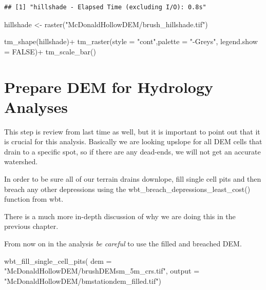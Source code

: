 \documentclass[
]{book}
\newenvironment{Shaded}{\begin{snugshade}}{\end{snugshade}}
\newcommand{\AttributeTok}[1]{\textcolor[rgb]{0.77,0.63,0.00}{#1}}
\newcommand{\ConstantTok}[1]{\textcolor[rgb]{0.00,0.00,0.00}{#1}}
\newcommand{\FunctionTok}[1]{\textcolor[rgb]{0.00,0.00,0.00}{#1}}
\newcommand{\NormalTok}[1]{#1}
\newcommand{\OtherTok}[1]{\textcolor[rgb]{0.56,0.35,0.01}{#1}}
\newcommand{\SpecialCharTok}[1]{\textcolor[rgb]{0.00,0.00,0.00}{#1}}
\newcommand{\StringTok}[1]{\textcolor[rgb]{0.31,0.60,0.02}{#1}}
\begin{document}
\begin{verbatim}
## [1] "hillshade - Elapsed Time (excluding I/O): 0.8s"
\end{verbatim}

\begin{Shaded}
\begin{Highlighting}[]
\NormalTok{hillshade }\OtherTok{\textless{}{-}} \FunctionTok{raster}\NormalTok{(}\StringTok{"McDonaldHollowDEM/brush\_hillshade.tif"}\NormalTok{)}

\FunctionTok{tm\_shape}\NormalTok{(hillshade)}\SpecialCharTok{+}
  \FunctionTok{tm\_raster}\NormalTok{(}\AttributeTok{style =} \StringTok{"cont"}\NormalTok{,}\AttributeTok{palette =} \StringTok{"{-}Greys"}\NormalTok{, }\AttributeTok{legend.show =} \ConstantTok{FALSE}\NormalTok{)}\SpecialCharTok{+}
  \FunctionTok{tm\_scale\_bar}\NormalTok{()}
\end{Highlighting}
\end{Shaded}

\hypertarget{prepare-dem-for-hydrology-analyses-1}{%
\section{Prepare DEM for Hydrology Analyses}\label{prepare-dem-for-hydrology-analyses-1}}

This step is review from last time as well, but it is important to point out that it is crucial for this analysis. Basically we are looking upslope for all DEM cells that drain to a specific spot, so if there are any dead-ends, we will not get an accurate watershed.

In order to be sure all of our terrain drains downlope, fill single cell pits and then breach any other depressions using the wbt\_breach\_depressions\_least\_cost() function from wbt.

There is a much more in-depth discussion of why we are doing this in the previous chapter.

From now on in the analysis \emph{be careful} to use the filled and breached DEM.

\begin{Shaded}
\begin{Highlighting}[]
\FunctionTok{wbt\_fill\_single\_cell\_pits}\NormalTok{(}
                    \AttributeTok{dem =} \StringTok{"McDonaldHollowDEM/brushDEMsm\_5m\_crs.tif"}\NormalTok{,}
                    \AttributeTok{output =} \StringTok{"McDonaldHollowDEM/bmstationdem\_filled.tif"}\NormalTok{)}
\end{Highlighting}
\end{Shaded}
\end{document}
